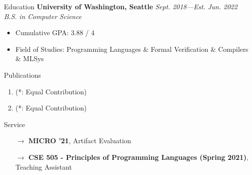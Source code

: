 \documentclass{resume}
\begin{document}
	\begin{rSection}{Education}
	{\bf University of Washington, Seattle} \hfill {\em Sept. 2018---Est. Jun. 2022} \\
	\textit{B.S. in Computer Science}
	\vspace{-5pt}
        \begin{itemize}[leftmargin=*]
            \setlength{\itemsep}{1pt}
            \setlength{\parskip}{0pt}
			\setlength{\parsep}{0pt}
			\item Cumulative GPA: 3.88 / 4
            \item Field of Studies: Programming Languages \& Formal Verification \& Compilers \& MLSys
		\end{itemize}
	\end{rSection}
	\vspace{-5pt}
    \begin{rSection}{Publications}
		\begin{enumerate}
			\setlength{\itemsep}{1pt}
            \setlength{\parskip}{0pt}
			\setlength{\parsep}{0pt}
			\item {} (\small{*: Equal Contribution})
			\item {} (\small{*: Equal Contribution})
		\end{enumerate}
        \vspace{-5pt}
	\end{rSection}
    \vspace{-5pt}
    \begin{rSection}{Service}
    	\begin{enumerate}
    		\setlength{\itemsep}{1pt}
            \setlength{\parskip}{0pt}
    		\setlength{\parsep}{0pt}
    		\item[$\rightarrow$] \textbf{MICRO '21}, Artifact Evaluation
    		\item[$\rightarrow$] \textbf{CSE 505 - Principles of Programming Languages (Spring 2021)}, Teaching Assistant
    	\end{enumerate}
	\end{rSection}
    \vspace{-5pt}
\end{document}
